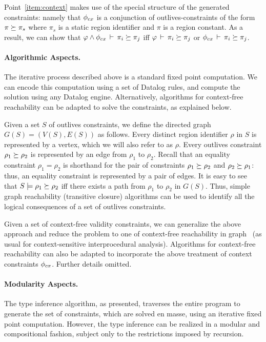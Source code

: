 Point~\ref{item:context} makes use of the special structure of the generated
constraints: namely that $\phi_{cx}$  is a conjunction of outlives-constraints of the
form $\pi \succeq \pi_s$ where $\pi_s$ is a static region identifier and $\pi$ is a
region constant. As a result, we can show that $\varphi \wedge \phi_{cx}\,\vdash\,\pi_i \succeq \pi_j$
iff $\varphi\,\vdash\,\pi_i \succeq \pi_j$ or $\phi_{cx}\,\vdash\,\pi_i \succeq \pi_j$.

\paragraph{Algorithmic Aspects.}
The iterative process described above is a standard fixed point computation.
We can encode this computation using a set of Datalog rules,
and compute the solution using any Datalog engine.
Alternatively, algorithms for context-free reachability can be adapted
to solve the constraints, as explained below.

Given a set $S$ of outlives constraints, we define the directed
graph $G(S)=(V(S),E(S))$ as follows.
Every distinct region identifier $\rho$ in $S$ is represented by a vertex,
which we will also refer to as $\rho$.
Every outlives constraint $\rho_1 \succeq \rho_2$ is represented by
an edge from $\rho_1$ to $\rho_2$.
Recall that an equality constraint $\rho_1 = \rho_2$ is shorthand
for the pair of constraints $\rho_1 \succeq \rho_2$ and
$\rho_2 \succeq \rho_1$: thus, an equality constraint is represented
by a pair of edges.
%
It is easy to see that $S \models \rho_1 \succeq \rho_2$ iff
there exists a path from $\rho_1$ to $\rho_2$ in $G(S)$.
%
Thus, simple graph reachability (transitive closure) algorithms can be
used to identify all the logical consequences of a set of outlives
constraints.

Given a set of context-free validity constraints, we can generalize the
above approach and reduce the problem to one of context-free reachability
in graph~\cite{Reps:Reachability} (as usual for context-sensitive interprocedural analysis).
%
Algorithms for context-free reachability can also be adapted to incorporate
the above treatment of context constraints $\phi_{cx}$.
%
Further details omitted.

\paragraph{Modularity Aspects.}
The type inference algorithm, as presented, traverses the entire program to
generate the set of constraints, which are solved en masse, using an iterative
fixed point computation. However, the type inference can be realized in a
modular and compositional fashion, subject only to the restrictions imposed
by recursion.

